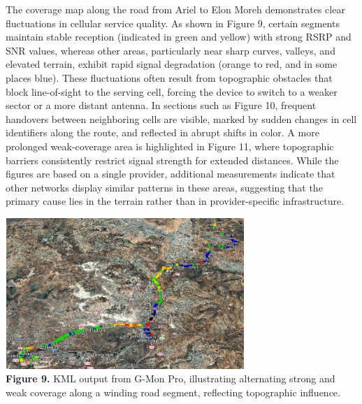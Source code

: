 \documentclass[11pt]{article}
\begin{document}
The coverage map along the road from Ariel to Elon Moreh demonstrates
clear fluctuations in cellular service quality. As shown in Figure 9,
certain segments maintain stable reception (indicated in green and
yellow) with strong RSRP and SNR values, whereas other areas,
particularly near sharp curves, valleys, and elevated terrain, exhibit
rapid signal degradation (orange to red, and in some places blue). These
fluctuations often result from topographic obstacles that block
line-of-sight to the serving cell, forcing the device to switch to a
weaker sector or a more distant antenna. In sections such as Figure 10,
frequent handovers between neighboring cells are visible, marked by
sudden changes in cell identifiers along the route, and reflected in
abrupt shifts in color. A more prolonged weak-coverage area is
highlighted in Figure 11, where topographic barriers consistently
restrict signal strength for extended distances. While the figures are
based on a single provider, additional measurements indicate that other
networks display similar patterns in these areas, suggesting that the
primary cause lies in the terrain rather than in provider-specific
infrastructure.

\includegraphics[width=3.56458in,height=2.24773in]{figures/media/image11.png}\\
\textbf{Figure 9.} KML output from G-Mon Pro, illustrating alternating
strong and weak coverage along a winding road segment, reflecting
topographic influence.
\end{document}
